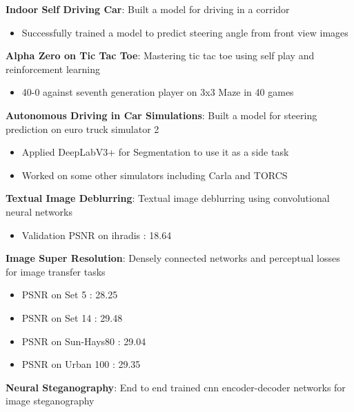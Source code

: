 \documentclass[letterpaper,11pt]{article}
\newcommand{\resumeItem}[2]{
  \item\small{
    \textbf{#1}{: #2 \vspace{-2pt}}
  }
}
\newcommand{\resumeSubItem}[2]{\resumeItem{#1}{#2}\vspace{-4pt}}
\begin{document}
      \resumeSubItem{Indoor Self Driving Car}
      {Built a model for driving in a corridor}
      \begin{itemize}
      \item Successfully trained a model to predict steering angle from front view images    
			\end{itemize}
    \resumeSubItem{Alpha Zero on Tic Tac Toe}
      {Mastering tic tac toe using self play and reinforcement learning}
      \begin{itemize}
      \item 40-0 against seventh generation player on 3x3 Maze in 40
games
			\end{itemize}
      
           \resumeSubItem{Autonomous Driving in Car Simulations}
      {Built a model for steering prediction on euro truck simulator 2}
      \begin{itemize}
\item Applied DeepLabV3+ for Segmentation to use it as a side task
\item Worked on some other simulators including Carla and TORCS
			\end{itemize}
      
      


    \resumeSubItem{Textual Image Deblurring}
      {Textual image deblurring using convolutional neural networks}

 \begin{itemize}
      \item Validation PSNR on ihradis : 18.64
			\end{itemize}
    \resumeSubItem{Image Super Resolution}
      {Densely connected networks and perceptual losses for
image transfer tasks}






 \begin{itemize}
      \item PSNR on Set 5 : 28.25
      \item PSNR on Set 14 : 29.48
      \item PSNR on Sun-Hays80 : 29.04
      \item PSNR on Urban 100 : 29.35
			\end{itemize}
			
			 \resumeSubItem{Neural Steganography}
      {End to end trained cnn encoder-decoder networks for
image steganography}
\end{document}
